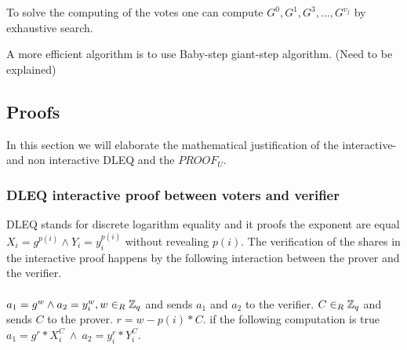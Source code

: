 To solve the computing of the votes one can compute \begin{math}G^0, G^1, G^3,..., G^{v_j} \end{math} by exhaustive search. 

 A more efficient algorithm is to use Baby-step giant-step algorithm. (Need to be explained)



\subsection{Proofs}
In this section we will elaborate the mathematical justification of the interactive- and non interactive DLEQ and the $PROOF_U$. 
\subsubsection{DLEQ interactive proof between voters and verifier}
DLEQ stands for discrete logarithm equality and it proofs the exponent are equal \begin{math}X_i=g^{p(i)}  \land Y_i=y_i^{p(i)} \end{math} without revealing \begin{math}{p(i)} \end{math}. The verification of the shares in the interactive proof happens by the following  interaction between the prover and the verifier.\\\\

\noindent
{}  \begin{math}a_1=g^w  \land a_2=y_i^w,  w\in_R \mathbb{Z}_q \end{math} and sends $a_1$ and $a_2$ to the verifier.   \begin{math}C\in_R \mathbb{Z}_q \end{math} and sends $C$ to the prover.   \begin{math}r=w-p(i) * C\end{math}.   if the following computation is true \begin{math}a_1 = g^r*X_i^C \ \land \ a_2=y_i^r*Y_i^C\end{math}.


